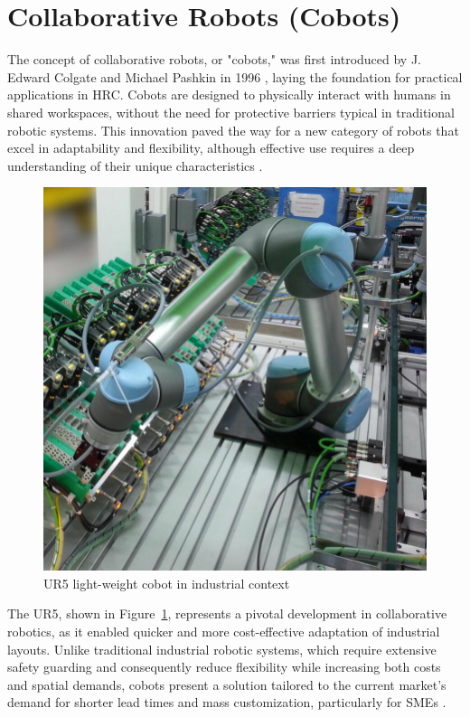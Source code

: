 
\section{Collaborative Robots (Cobots)} 

The concept of collaborative robots, or "cobots," was first introduced by J. Edward Colgate and Michael Pashkin in 1996 \cite{cobot-definition}, laying the foundation for practical applications in \ac{HRC}. Cobots are designed to physically interact with humans in shared workspaces, without the need for protective barriers typical in traditional robotic systems. This innovation paved the way for a new category of robots that excel in adaptability and flexibility, although effective use requires a deep understanding of their unique characteristics \cite{Aaltonen2019}.

\begin{figure}[!htbp]
    \centering
    \includegraphics[width=0.55\linewidth]{figs/ur5-industry.png}
    \caption{UR5 light-weight cobot in industrial context \cite{Jeffrey-UR5}} 
    \label{fig:ur5}
\end{figure} 

The UR5, shown in Figure~\ref{fig:ur5}, represents a pivotal development in collaborative robotics, as it enabled quicker and more cost-effective adaptation of industrial layouts. Unlike traditional industrial robotic systems, which require extensive safety guarding and consequently reduce flexibility while increasing both costs and spatial demands, cobots present a solution tailored to the current market's demand for shorter lead times and mass customization, particularly for \ac{SMEs} \cite{barbazza2017agility}.

